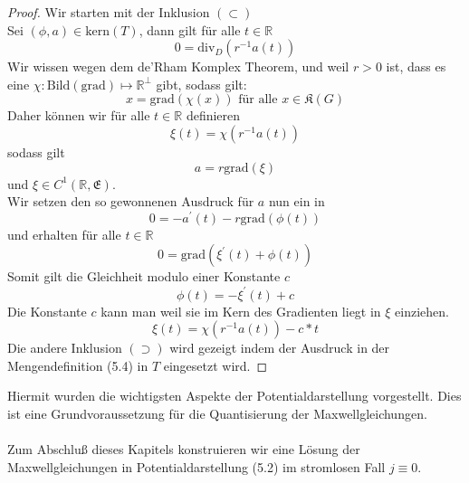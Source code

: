 \documentclass[11pt,a4paper,leqno]{report}
\numberwithin{equation}{chapter}
\begin{document}
\begin{proof}
Wir starten mit der Inklusion $(\subset)$\\
Sei $(\phi, a)\in \text{kern}(T)$, dann gilt f\"ur alle $t\in\mathbb{R}$
\begin{equation*}
	0 = \text{div}_D(r^{-1}a(t))
\end{equation*} 
Wir wissen wegen dem de'Rham Komplex Theorem, und weil $r>0$ ist, dass es eine  $\chi:\text{Bild}(\text{grad})\mapsto \mathbb{R}^\perp$ gibt, sodass gilt:
\begin{equation*}
	x = \text{grad}(\chi(x)) \text{ f\"ur  alle }x\in\mathfrak{K}(G)
\end{equation*}
Daher k\"onnen wir f\"ur alle $t\in\mathbb{R}$ definieren 
\begin{equation*}
\xi(t) = \chi(r^{-1}a(t))
\end{equation*} sodass gilt
\begin{equation*}
	a=r\text{grad}(\xi)
\end{equation*} und $\xi\in C^1(\mathbb{R},\mathfrak{E})$.\\
Wir setzen den so gewonnenen Ausdruck f\"ur $a$ nun ein in
\begin{equation*}
	0=-a^\prime(t) - r\text{grad}(\phi(t))
\end{equation*} 
und erhalten f\"ur alle $t\in\mathbb{R}$
\begin{equation*}
0=\text{grad}(\xi^\prime(t)+\phi(t))
\end{equation*} 
Somit gilt die Gleichheit modulo einer Konstante $c$
\begin{equation*}
\phi(t)=-\xi^\prime(t) +c
\end{equation*}
Die Konstante $c$ kann man weil sie im Kern des Gradienten liegt in $\xi$ einziehen.
\begin{equation*}
	\xi(t) = \chi(r^{-1}a(t)) -c*t
\end{equation*}
\noindent
Die andere Inklusion $(\supset)$ wird gezeigt indem der Ausdruck in der Mengendefinition (5.4) in $T$ eingesetzt wird.
\end{proof}
\noindent
Hiermit wurden die wichtigsten Aspekte der Potentialdarstellung vorgestellt. Dies ist eine Grundvoraussetzung f\"ur die Quantisierung der Maxwellgleichungen.\\
\\
Zum Abschlu\ss{} dieses Kapitels konstruieren wir eine L\"osung der Maxwellgleichungen in Potentialdarstellung (5.2) im stromlosen Fall $j\equiv 0$.\\
\\
\end{document}
